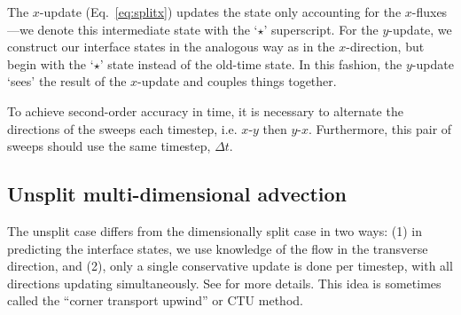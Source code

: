 The $x$-update
(Eq.~\ref{eq:splitx}) updates the state only accounting for the
$x$-fluxes---we denote this intermediate state with the `$\star$'
superscript.  For the $y$-update, we construct our interface states in
the analogous way as in the $x$-direction, but begin with the `$\star$'
state instead of the old-time state.  In this fashion, the $y$-update
`sees' the result of the $x$-update and couples things together.

To achieve second-order accuracy in time, it is necessary to alternate
the directions of the sweeps each timestep, i.e. $x$-$y$ then $y$-$x$.
Furthermore, this pair of sweeps should use the same timestep, $\Delta t$.


\subsection{Unsplit multi-dimensional advection}

The unsplit case differs from the dimensionally split case in two
ways: (1) in predicting the interface states, we use knowledge of the
flow in the transverse direction, and (2), only a single conservative
update is done per timestep, with all directions updating
simultaneously.  See \cite{colella1990} for more details.  This idea
is sometimes called the ``corner transport upwind'' or CTU method.

